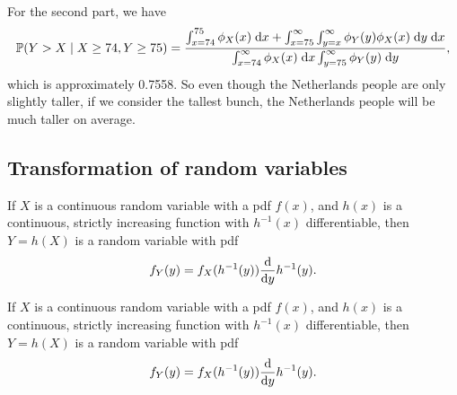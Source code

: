 \begin{note}
\begin{field}
\begin{eg}
      For the second part, we have
      \[
        \mathbb{P}(Y > X\mid X \geq 74, Y \geq 75) = \frac{\int_{x = 74}^{75} \phi_X(x)\;\mathrm{d} x + \int_{x = 75}^\infty \int_{y=x}^\infty \phi_Y(y)\phi_X(x)\;\mathrm{d} y\;\mathrm{d} x}{\int_{x=74}^\infty \phi_X(x)\;\mathrm{d} x \int_{y=75}^\infty \phi_Y(y)\;\mathrm{d} y},
      \]
      which is approximately 0.7558. So even though the Netherlands people are only slightly taller, if we consider the tallest bunch, the Netherlands people will be much taller on average.
    \end{eg}
  \end{field}
  \xplain{}%
\end{note}

\subsection{Transformation of random variables}

\begin{note}
  \begin{field}
    \begin{thm}
      If $X$ is a continuous random variable with a pdf $f(x)$, and $h(x)$ is a continuous, strictly increasing function with $h^{-1}(x)$ differentiable, then $Y = h(X)$ is a random variable with pdf
      \[
        f_Y(y) = f_X(h^{-1}(y))\frac{\mathrm{d} }{\mathrm{d} y}h^{-1}(y).
      \]
    \end{thm}
  \end{field}
  \begin{field}
    \begin{thm}
      If $X$ is a continuous random variable with a pdf $f(x)$, and $h(x)$ is a continuous, strictly increasing function with $h^{-1}(x)$ differentiable, then $Y = h(X)$ is a random variable with pdf
      \[
        f_Y(y) = f_X(h^{-1}(y))\frac{\mathrm{d} }{\mathrm{d} y}h^{-1}(y).
      \]
    \end{thm}
  \end{field}
  \xplain{}%
\end{note}

